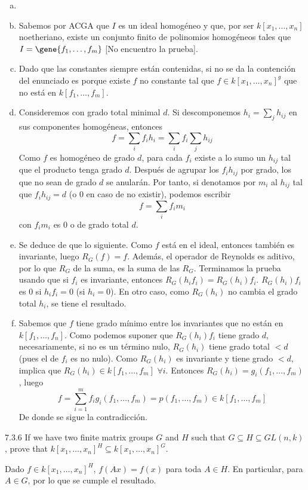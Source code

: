 \documentclass[twoside]{article}
\begin{document}
\begin{solucion}
\begin{enumerate}[a.]
\item[]
\item Sabemos por ACGA que $I$ es un ideal homogéneo y que, por ser $k[x_1,\dotsc,x_n]$ noetheriano, existe un conjunto finito de polinomios homogéneos tales que $I=\gene{f_1,\dotsc,f_m}$ [No encuentro la prueba].
\item Dado que las constantes siempre están contenidas, si no se da la contención del enunciado es porque existe $f$ no constante tal que $f\in k[x_1,\dotsc,x_n]^g$ que no está en $k[f_1,\dotsc,f_m]$.
\item Consideremos con grado total minimal $d$. Si descomponemos $h_i = \sum_{j} h_{ij}$ en sus componentes homogéneas, entonces
$$
f = \sum_i f_i h_i = \sum_i f_i \sum_j  h_{ij}
$$
Como $f$ es homogéneo de grado $d$, para cada $f_i$ existe a lo sumo un $h_{ij}$ tal que el producto tenga grado $d$. Después de agrupar los $f_i h_{ij}$ por grado, los que no sean de grado $d$ se anularán. Por tanto, si denotamos por $m_i$ al $h_{ij}$ tal que $f_i h_{ij}=d$ (o $0$ en caso de no existir), podemos escribir
$$
f = \sum_i f_i m_i 
$$
con $f_i m_i$ es $0$ o de grado total $d$.

\item Se deduce de que lo siguiente. Como $f$ está en el ideal, entonces también es invariante, luego $R_G(f)=f$. Además, el operador de Reynolds es aditivo, por lo que $R_G$ de la suma, es la suma de las $R_G$. Terminamos la prueba usando que si $f_i$ es invariante, entonces $R_G(h_if_i)=R_G(h_i)f_i$. $R_G(h_i)f_i$ es $0$ si $h_i f_i = 0$ (si $h_i = 0$). En otro caso, como $R_G(h_i)$ no cambia el grado total $h_i$, se tiene el resultado.
\item Sabemos que $f$ tiene grado mínimo entre los invariantes que no están en $k[f_1,\dotsc,f_n]$. Como podemos suponer que $R_G(h_i)f_i$ tiene grado $d$, necesariamente, si no es un término nulo, $R_G(h_i)$ tiene grado total $<d$ (pues el de $f_i$ es no nulo). Como $R_G(h_i)$ es invariante y tiene grado $<d$, implica que $R_G(h_i)\in k[f_1,\dotsc,f_m]$ $\forall i$. Entonces $R_G(h_i) = g_i(f_1,\dotsc,f_m)$, luego
$$
f = \sum_{i=1}^m f_i g_i(f_1,\dotsc,f_m) = p(f_1,\dotsc,f_m) \in k[f_1,\dotsc,f_m]
$$
De donde se sigue la contradicción.
\end{enumerate}
\end{solucion}
\newpage

\begin{ejercicio}{7.3.6}
If we have two finite matrix groups $G$ and $H$ such that $G ⊆ H ⊆ GL(n, k)$, prove that
$k[x_1, \dots , x_n]^H ⊆ k[x_1, \dots , x_n]^G$.
\end{ejercicio}
\begin{solucion}
Dado $f\in k[x_1, \dots , x_n]^H$, $f(Ax)=f(x)$ para toda $A\in H$. En particular, para $A\in G$, por lo que se cumple el resultado.
\end{solucion}
\newpage
\end{document}
